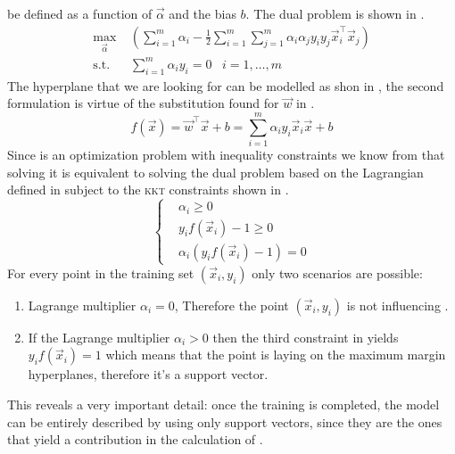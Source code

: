 be defined as a function of $\vec{\alpha}$ and the bias $b$. The dual problem is shown in .
\begin{equation}
	\label{eq:dual}
	\begin{aligned}
		\max_{\vec{\alpha}}       & \left(\sum_{i = 1}^{m}{\alpha_i} - \frac{1}{2}\sum_{i =
		1}^{m}\sum_{j = 1}^{m}{\alpha_i\alpha_j y_i y_j \vec{x}_i^\top\vec{x}_j}\right)               \\
		\text{s.t.} \hspace{10pt} & \sum_{i = 1}^{m}{\alpha_i y_i} = 0 \hspace{10pt} i = 1, \ldots, m
	\end{aligned}
\end{equation}
The hyperplane that we are looking for can be modelled as shon in , the second
formulation is virtue of the substitution found for $\vec{w}$ in .
\begin{equation}
	\label{eq:of}
	f(\vec{x}) = \vec{w}^\top\vec{x} + b = \sum_{i = 1}^m\alpha_iy_i\vec{x}_i\vec{x} + b
\end{equation}
Since  is an optimization problem with inequality constraints we
know from \cite{kkt1951} that solving it is equivalent to solving the dual problem based on the
Lagrangian defined in  subject to the \textsc{kkt} constraints shown in
.
\begin{equation}
	\label{eq:kkt-constraints}
	\begin{cases}
		 & \alpha_i \geq 0                   \\
		 & y_if(\vec{x}_i) - 1 \geq 0        \\
		 & \alpha_i(y_if(\vec{x}_i) - 1) = 0
	\end{cases}
\end{equation}
For every point in the training set $(\vec{x}_i, y_i)$ only two scenarios are possible:
\begin{enumerate}
	\item Lagrange multiplier $\alpha_i = 0$, Therefore the point $(\vec{x}_i, y_i)$ is not
		influencing .
	\item If the Lagrange multiplier $\alpha_i > 0$ then the third constraint in
	       yields $y_if(\vec{x}_i) = 1$ which means that the point is
	      laying on the maximum margin hyperplanes, therefore it's a support vector.
\end{enumerate}
This reveals a very important detail: once the training is completed, the model can be entirely
described by using only support vectors, since they are the ones that yield a contribution in the
calculation of .

